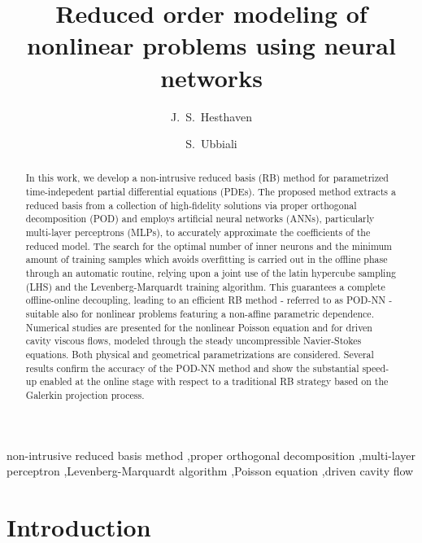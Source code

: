 \documentclass{elsarticle}
\numberwithin{equation}{section}
\theoremstyle{theorem}
\theoremstyle{definition}
\theoremstyle{remark}
\theoremstyle{proposition}
\numberwithin{figure}{section}
\begin{document}
	
	\begin{frontmatter}
		\title{Reduced order modeling of nonlinear problems using neural networks}
		
		\author{J.~S.~Hesthaven}
		
		\author{S.~Ubbiali}
		
		\address{\'Ecole Polytechnique F\'ed\'erale de Lausanne (EPFL), CH-1015 Lausanne, Switzerland}
		
		\begin{abstract}
			In this work, we develop a non-intrusive reduced basis (RB) method for pa\-ra\-me\-tri\-zed time-indepedent partial differential equations (PDEs). The proposed method extracts a reduced basis from a collection of high-fidelity solutions via proper orthogonal decomposition (POD) and employs artificial neural networks (ANNs), particularly multi-layer perceptrons (MLPs), to accurately approximate the coefficients of the reduced model. The search for the optimal number of inner neurons and the minimum amount of training samples which avoids overfitting is carried out in the offline phase through an automatic routine, relying upon a joint use of the latin hypercube sampling (LHS) and the Levenberg-Marquardt training algorithm. This guarantees a complete offline-online decoupling, leading to an efficient RB method - referred to as POD-NN - suitable also for nonlinear problems featuring a non-affine parametric dependence. Numerical studies are presented for the nonlinear Poisson equation and for driven cavity viscous flows, modeled through the steady uncompressible Navier-Stokes equations. Both physical and geometrical parametrizations are considered. Several results confirm the accuracy of the POD-NN method and show the substantial speed-up enabled at the online stage with respect to a traditional RB strategy based on the Galerkin projection process.
		\end{abstract}
		
		\begin{keyword}
			non-intrusive reduced basis method \sep proper orthogonal decomposition \sep multi-layer perceptron \sep Levenberg-Marquardt algorithm \sep Poisson equation \sep driven cavity flow
		\end{keyword}
	\end{frontmatter}
	
	
	
	\section{Introduction}
	\label{section:Introduction}
		
\end{document}
